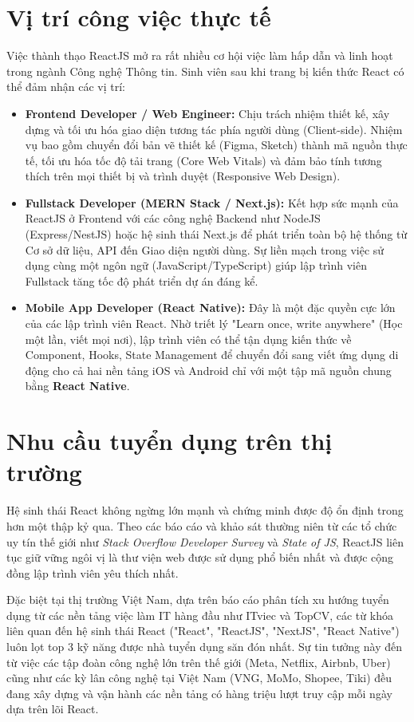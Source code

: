 \section{Vị trí công việc thực tế}
Việc thành thạo ReactJS mở ra rất nhiều cơ hội việc làm hấp dẫn và linh hoạt trong ngành Công nghệ Thông tin. Sinh viên sau khi trang bị kiến thức React có thể đảm nhận các vị trí:
\begin{itemize}
    \item \textbf{Frontend Developer / Web Engineer:} Chịu trách nhiệm thiết kế, xây dựng và tối ưu hóa giao diện tương tác phía người dùng (Client-side). Nhiệm vụ bao gồm chuyển đổi bản vẽ thiết kế (Figma, Sketch) thành mã nguồn thực tế, tối ưu hóa tốc độ tải trang (Core Web Vitals) và đảm bảo tính tương thích trên mọi thiết bị và trình duyệt (Responsive Web Design).
    \item \textbf{Fullstack Developer (MERN Stack / Next.js):} Kết hợp sức mạnh của ReactJS ở Frontend với các công nghệ Backend như NodeJS (Express/NestJS) hoặc hệ sinh thái Next.js để phát triển toàn bộ hệ thống từ Cơ sở dữ liệu, API đến Giao diện người dùng. Sự liền mạch trong việc sử dụng cùng một ngôn ngữ (JavaScript/TypeScript) giúp lập trình viên Fullstack tăng tốc độ phát triển dự án đáng kể.
    \item \textbf{Mobile App Developer (React Native):} Đây là một đặc quyền cực lớn của các lập trình viên React. Nhờ triết lý "Learn once, write anywhere" (Học một lần, viết mọi nơi), lập trình viên có thể tận dụng kiến thức về Component, Hooks, State Management để chuyển đổi sang viết ứng dụng di động cho cả hai nền tảng iOS và Android chỉ với một tập mã nguồn chung bằng \textbf{React Native}.
\end{itemize}

\section{Nhu cầu tuyển dụng trên thị trường}
Hệ sinh thái React không ngừng lớn mạnh và chứng minh được độ ổn định trong hơn một thập kỷ qua.
Theo các báo cáo và khảo sát thường niên từ các tổ chức uy tín thế giới như \textit{Stack Overflow Developer Survey} và \textit{State of JS}, ReactJS liên tục giữ vững ngôi vị là thư viện web được sử dụng phổ biến nhất và được cộng đồng lập trình viên yêu thích nhất.

Đặc biệt tại thị trường Việt Nam, dựa trên báo cáo phân tích xu hướng tuyển dụng từ các nền tảng việc làm IT hàng đầu như ITviec và TopCV, các từ khóa liên quan đến hệ sinh thái React ("React", "ReactJS", "NextJS", "React Native") luôn lọt top 3 kỹ năng được nhà tuyển dụng săn đón nhất. Sự tin tưởng này đến từ việc các tập đoàn công nghệ lớn trên thế giới (Meta, Netflix, Airbnb, Uber) cũng như các kỳ lân công nghệ tại Việt Nam (VNG, MoMo, Shopee, Tiki) đều đang xây dựng và vận hành các nền tảng có hàng triệu lượt truy cập mỗi ngày dựa trên lõi React.

